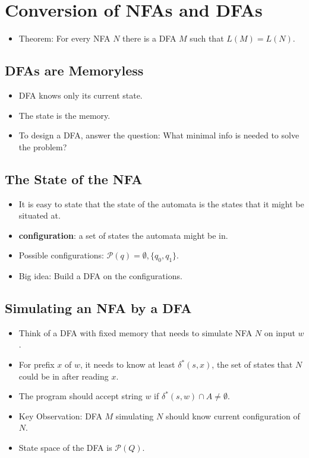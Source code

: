 \section{Conversion of NFAs and DFAs}
\begin{itemize}
    \item Theorem: For every NFA $N$ there is a DFA $M$ such that $L(M) = L(N)$.
\end{itemize}

\subsection{DFAs are Memoryless}
\begin{itemize}
    \item DFA knows only its current state.
    \item The state is the memory.
    \item To design a DFA, answer the question: What minimal info is needed to solve the problem?
\end{itemize}

\subsection{The State of the NFA}
\begin{itemize}
    \item It is easy to state that the state of the automata is the states that it might be situated at.
    \item \textbf{configuration}: a set of states the automata might be in.
    \item Possible configurations: $\mathcal{P}(q) = \emptyset, \{ q_0, q_1 \}$.
    \item Big idea: Build a DFA on the configurations.
\end{itemize}

\subsection{Simulating an NFA by a DFA}
\begin{itemize}
    \item Think of a DFA with fixed memory that needs to simulate NFA $N$ on input $w$.
    \item For prefix $x$ of $w$, it needs to know at least $\delta^{\ast}(s, x)$, the set of states that $N$ could be in after reading $x$.
    \item The program should accept string $w$ if $\delta^{\ast}(s, w) \cap A \neq \emptyset$.
    \item Key Observation: DFA $M$ simulating $N$ should know current configuration of $N$.
    \item State space of the DFA is $\mathcal{P}(Q)$.
\end{itemize}

